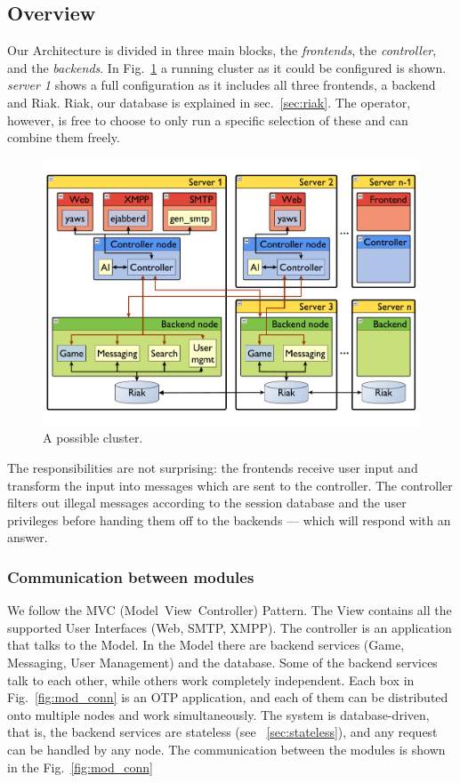 \documentclass[11pt,a4paper]{report}
\begin{document}
\subsection{Overview}

Our Architecture is divided in three main blocks, the {\em frontends}, the
{\em controller}, and the {\em backends}. In Fig.~\ref{fig:arch} a running
cluster as it could be configured is shown. {\em server 1} shows a full
configuration as it includes all three frontends, a backend and Riak. Riak, our
database is explained in sec.~\ref{sec:riak}.
The operator, however, is free to choose to only run a specific selection of
these and can combine them freely.

\begin{figure}[h]
 \centering
 \includegraphics[width=\textwidth]{./graphics/arch.pdf}
 \caption{A possible cluster.}
 \label{fig:arch}
\end{figure}

The responsibilities are not surprising: the frontends receive user input and
transform the input into messages which are sent to the controller.
The controller filters out illegal messages according to the session database
and the user privileges before handing them off to the backends --- which will
respond with an answer.

\subsubsection{Communication between modules}
We follow the MVC\cite{mvc} (Model~View~Controller) Pattern.
The View contains all the supported User Interfaces (Web, SMTP, XMPP). The
controller is an application that talks to the Model. In the Model there
are backend services (Game, Messaging, User Management) and the database.
Some of the backend services talk to each other, while others work completely
independent. Each box in Fig.~\ref{fig:mod_conn} is an OTP application, and
each of them can be distributed onto multiple nodes and work simultaneously.
The system is database-driven, that is, the backend services are stateless
(see ~\ref{sec:stateless}), and any request can be handled
by any node. The communication between the modules is shown in the
Fig.~\ref{fig:mod_conn}
\end{document}
